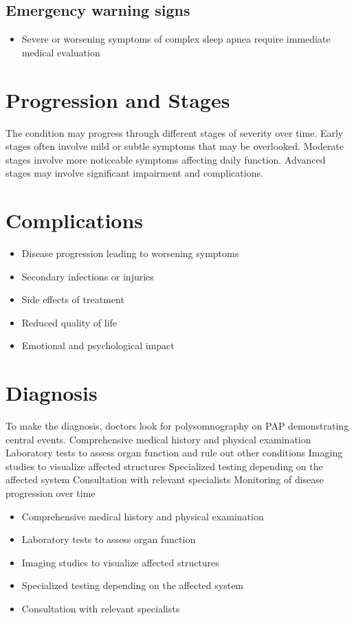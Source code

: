\subsection{Emergency warning signs}
\begin{itemize}[noitemsep]
  \item Severe or worsening symptoms of complex sleep apnea require immediate medical evaluation
\end{itemize}
\section{Progression and Stages}
The condition may progress through different stages of severity over time. Early stages often involve mild or subtle symptoms that may be overlooked. Moderate stages involve more noticeable symptoms affecting daily function. Advanced stages may involve significant impairment and complications.
\section{Complications}
\begin{itemize}[noitemsep]
  \item Disease progression leading to worsening symptoms
  \item Secondary infections or injuries
  \item Side effects of treatment
  \item Reduced quality of life
  \item Emotional and psychological impact
\end{itemize}
\section{Diagnosis}
To make the diagnosis, doctors look for polysomnography on PAP demonstrating central events. Comprehensive medical history and physical examination Laboratory tests to assess organ function and rule out other conditions Imaging studies to visualize affected structures Specialized testing depending on the affected system Consultation with relevant specialists Monitoring of disease progression over time

\begin{itemize}[noitemsep]
  \item Comprehensive medical history and physical examination
  \item Laboratory tests to assess organ function
  \item Imaging studies to visualize affected structures
  \item Specialized testing depending on the affected system
  \item Consultation with relevant specialists
\end{itemize}
